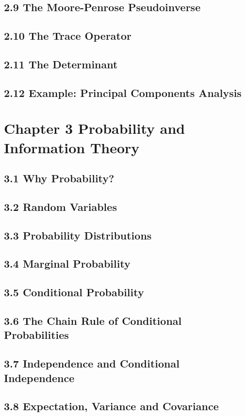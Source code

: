 \documentclass[a4paper]{report}
\begin{document}
\subsection{2.9 The Moore-Penrose Pseudoinverse}
\subsection{2.10 The Trace Operator}
\subsection{2.11 The Determinant}
\subsection{2.12 Example: Principal Components Analysis}

\section{Chapter 3 Probability and Information Theory}
\subsection{3.1 Why Probability?}
\subsection{3.2 Random Variables}
\subsection{3.3 Probability Distributions}
\subsection{3.4 Marginal Probability}
\subsection{3.5 Conditional Probability}
\subsection{3.6 The Chain Rule of Conditional Probabilities}
\subsection{3.7 Independence and Conditional Independence}
\subsection{3.8 Expectation, Variance and Covariance}
\end{document}

